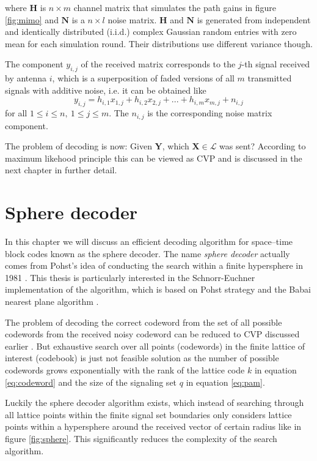 \documentclass[english,12pt,a4paper,pdftex,sci,utf8]{aaltothesis}
\begin{document}
where $\mathbf{H}$ is $n \times m$ channel matrix that simulates the path gains in figure \ref{fig:mimo} and $\mathbf{N}$ is a $n\times l$ noise matrix. $\mathbf{H}$ and $\mathbf{N}$ is generated from independent and identically distributed  (i.i.d.) complex Gaussian random entries with zero mean for each simulation round. Their distributions use different variance though. 
\par The component $y_{i,j}$ of the received matrix corresponds to the $j$-th signal received by antenna $i$, which is a superposition of faded versions of all $m$ transmitted signals with additive noise, i.e. it can be obtained like
\begin{equation}
y_{i,j} = h_{i,1}x_{1,j}+h_{i,2}x_{2,j}+...+h_{i,m}x_{m,j}+n_{i,j}   
\label{eq:component}
\end{equation}
for all $1 \leq i \leq n, \ 1 \leq j \leq m$. The $n_{i,j}$ is the corresponding noise matrix component.
\par The problem of decoding is now: Given $\mathbf{Y}$, which $\mathbf{X} \in \mathcal{L}$ was sent? According to maximum likehood principle this can be viewed as CVP \cite{mia} and is discussed in the next chapter in further detail.

\clearpage

\section{Sphere decoder}

In this chapter we will discuss an efficient decoding algorithm for space--time block codes known as the sphere decoder. The name \emph{sphere decoder} actually comes from Pohst's idea of conducting the search within a finite hypersphere in 1981 \cite{agrell}. This thesis is particularly interested in the Schnorr-Euchner implementation of the algorithm, which is based on Pohst strategy and the Babai nearest plane algorithm \cite{agrell}. 
\par The problem of decoding the correct codeword from the set of all possible codewords from the received noisy codeword can be reduced to CVP discussed earlier \cite{mia}. But exhaustive search over all points (codewords) in the finite lattice of interest (codebook) is just not feasible solution as the number of possible codewords grows exponentially with the rank of the lattice code $k$ in equation \eqref{eq:codeword} and the size of the signaling set $q$ in equation \eqref{eq:pam}. 
\par Luckily the sphere decoder algorithm exists, which instead of searching through all lattice points within the finite signal set boundaries only considers lattice points within a hypersphere around the received vector of certain radius like in figure \ref{fig:sphere}. This significantly reduces the complexity of the search algorithm. 
\end{document}

